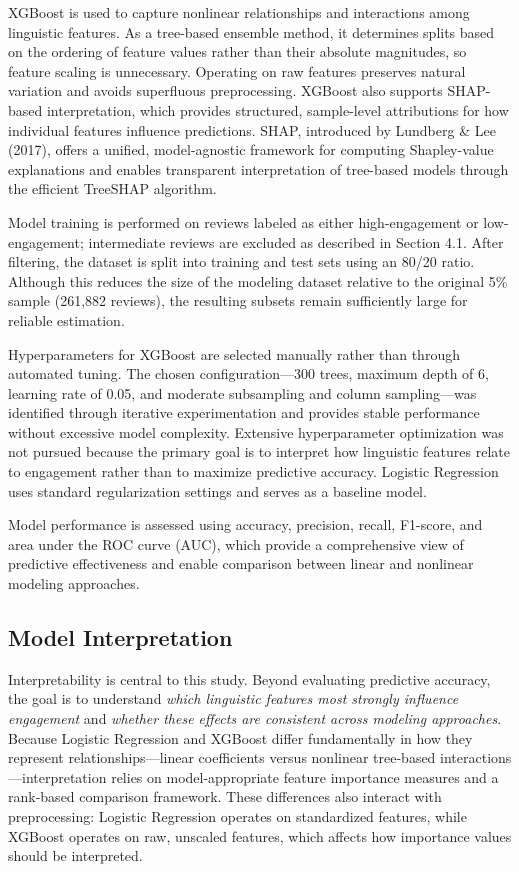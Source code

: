 \documentclass[12pt]{article}
\begin{document}
XGBoost is used to capture nonlinear relationships and interactions among linguistic features. As a tree-based ensemble method, it determines splits based on the ordering of feature values rather than their absolute magnitudes, so feature scaling is unnecessary. Operating on raw features preserves natural variation and avoids superfluous preprocessing. XGBoost also supports SHAP-based interpretation, which provides structured, sample-level attributions for how individual features influence predictions. SHAP, introduced by Lundberg \& Lee (2017), offers a unified, model-agnostic framework for computing Shapley-value explanations and enables transparent interpretation of tree-based models through the efficient TreeSHAP algorithm.

Model training is performed on reviews labeled as either high-engagement or low-engagement; intermediate reviews are excluded as described in Section 4.1. After filtering, the dataset is split into training and test sets using an 80/20 ratio. Although this reduces the size of the modeling dataset relative to the original 5\% sample (261,882 reviews), the resulting subsets remain sufficiently large for reliable estimation.

Hyperparameters for XGBoost are selected manually rather than through automated tuning. The chosen configuration—300 trees, maximum depth of 6, learning rate of 0.05, and moderate subsampling and column sampling—was identified through iterative experimentation and provides stable performance without excessive model complexity. Extensive hyperparameter optimization was not pursued because the primary goal is to interpret how linguistic features relate to engagement rather than to maximize predictive accuracy. Logistic Regression uses standard regularization settings and serves as a baseline model.

Model performance is assessed using accuracy, precision, recall, F1-score, and area under the ROC curve (AUC), which provide a comprehensive view of predictive effectiveness and enable comparison between linear and nonlinear modeling approaches.

\subsection{Model Interpretation}

Interpretability is central to this study. Beyond evaluating predictive accuracy, the goal is to understand \emph{which linguistic features most strongly influence engagement} and \emph{whether these effects are consistent across modeling approaches}. Because Logistic Regression and XGBoost differ fundamentally in how they represent relationships—linear coefficients versus nonlinear tree-based interactions—interpretation relies on model-appropriate feature importance measures and a rank-based comparison framework. These differences also interact with preprocessing: Logistic Regression operates on standardized features, while XGBoost operates on raw, unscaled features, which affects how importance values should be interpreted.
\end{document}
